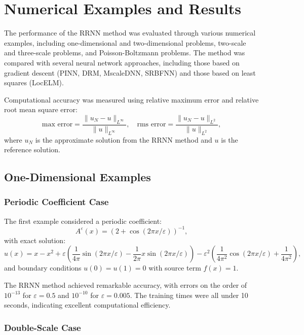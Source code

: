 \documentclass[11pt]{article}
\begin{document}
\section{Numerical Examples and Results}

The performance of the RRNN method was evaluated through various numerical examples, including one-dimensional and two-dimensional problems, two-scale and three-scale problems, and Poisson-Boltzmann problems. The method was compared with several neural network approaches, including those based on gradient descent (PINN, DRM, MscaleDNN, SRBFNN) and those based on least squares (LocELM).

Computational accuracy was measured using relative maximum error and relative root mean square error:
\begin{equation}
\text{max error} = \frac{\|u_N - u\|_{L^{\infty}}}{\|u\|_{L^{\infty}}}, \quad \text{rms error} = \frac{\|u_N - u\|_{L^2}}{\|u\|_{L^2}},
\end{equation}
where $u_N$ is the approximate solution from the RRNN method and $u$ is the reference solution.

\subsection{One-Dimensional Examples}

\subsubsection{Periodic Coefficient Case}

The first example considered a periodic coefficient:
\begin{equation}
A^{\varepsilon}(x) = (2 + \cos(2\pi x/\varepsilon))^{-1},
\end{equation}
with exact solution:
\begin{equation}
u(x) = x - x^2 + \varepsilon(\frac{1}{4\pi}\sin(2\pi x/\varepsilon) - \frac{1}{2\pi}x\sin(2\pi x/\varepsilon)) - \varepsilon^2(\frac{1}{4\pi^2}\cos(2\pi x/\varepsilon) + \frac{1}{4\pi^2}),
\end{equation}
and boundary conditions $u(0) = u(1) = 0$ with source term $f(x) = 1$.

The RRNN method achieved remarkable accuracy, with errors on the order of $10^{-13}$ for $\varepsilon = 0.5$ and $10^{-10}$ for $\varepsilon = 0.005$. The training times were all under 10 seconds, indicating excellent computational efficiency.

\subsubsection{Double-Scale Case}
\end{document}
